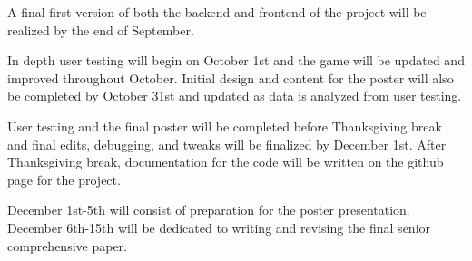 \documentclass[10pt,twocolumn]{article}
\begin{document}
A final first version of both the backend and frontend of the project will be realized by the end of September. 

In depth user testing will begin on October 1st and the game will be updated and improved throughout October.  Initial design and content for the poster will also be completed by October 31st and updated as data is analyzed from user testing. 

User testing and the final poster will be completed before Thanksgiving break and final edits, debugging, and tweaks will be finalized by December 1st. After Thanksgiving break, documentation for the code will be written on the github page for the project. 

December 1st-5th will consist of preparation for the poster presentation.  December 6th-15th will be dedicated to writing and revising the final senior comprehensive paper. 

\printbibliography 
\end{document}
